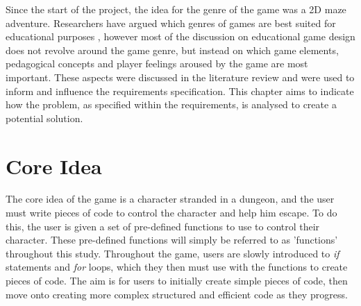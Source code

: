 \documentclass[a4paper,11.5pt]{report}
\numberwithin{figure}{section}
\numberwithin{table}{section}
\numberwithin{equation}{section}
\numberwithin{equation}{section}
\begin{document}





Since the start of the project, the idea for the genre of the game was a 2D maze adventure. Researchers have argued which genres of games are best suited for educational purposes \citep{moreno2008}, however most of the discussion on educational game design does not revolve around the game genre, but instead on which game elements, pedagogical concepts and player feelings aroused by the game are most important. These aspects were discussed in the literature review and were used to inform and influence the requirements specification. This chapter aims to indicate how the problem, as specified within the requirements, is analysed to create a potential solution.

\section{Core Idea}

The core idea of the game is a character stranded in a dungeon, and the user must write pieces of code to control the character and help him escape. To do this, the user is given a set of pre-defined functions to use to control their character. These pre-defined functions will simply be referred to as 'functions' throughout this study. Throughout the game, users are slowly introduced to \textit{if} statements and \textit{for} loops, which they then must use with the functions to create pieces of code. The aim is for users to initially create simple pieces of code, then move onto creating more complex structured and efficient code as they progress.
\end{document}
